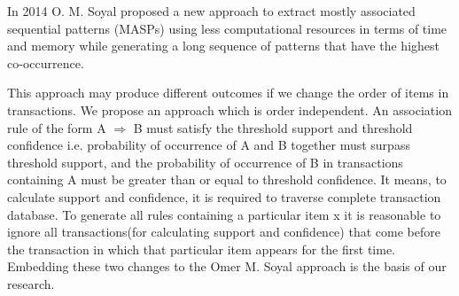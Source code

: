 \documentclass[review]{elsarticle}
\begin{document}
In 2014 O. M. Soyal \cite{oldmasp} proposed a new approach to extract mostly associated sequential patterns (MASPs) using less computational resources in terms of time and memory while generating a long sequence of patterns that have the highest co-occurrence.

This approach may produce different outcomes if we change the order of items in transactions. We propose an approach which is order independent. An association rule of the form A $\Rightarrow$ B must satisfy the threshold support and threshold confidence i.e. probability of occurrence of A and B together must surpass threshold support, and the probability of occurrence of B in transactions containing A must be greater than or equal to threshold confidence. It means, to calculate support and confidence, it is required to traverse complete transaction database. To generate all rules containing a particular item x it is reasonable to ignore all transactions(for calculating support and confidence) that come before the transaction in which that particular item appears for the first time. Embedding these two changes to the Omer M. Soyal \cite{oldmasp} approach is the basis of our research.
\end{document}
